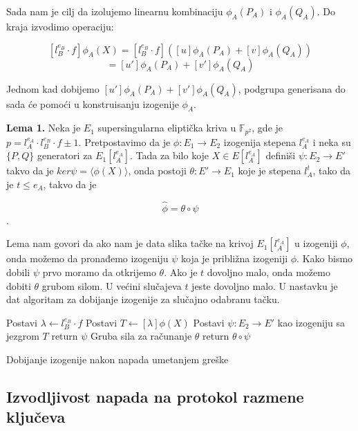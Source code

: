 \documentclass[a4paper]{article}
\begin{document}
\noindent Sada nam je cilj da izolujemo linearnu kombinaciju $ \phi_A(P_A)$ i  $ \phi_A(Q_A)$. Do kraja izvodimo operaciju:

$$[l^{e_B}_{B} \cdot f]\phi_A(X) = [l^{e_B}_{B} \cdot f] ([u]\phi_A(P_A) + [v]\phi_A(Q_A))$$
$$= [u']\phi_A(P_A) + [v']\phi_A(Q_A)$$

Jednom kad dobijemo $ [u']\phi_A(P_A) + [v']\phi_A(Q_A)$, podgrupa generisana do sada će pomoći u konstruisanju izogenije $\phi_A$.


\textbf{Lema 1.} Neka je $E_1$ supersingularna eliptička kriva u $\mathbb{F}_{p^2}$, gde je $p = l^{e_A}_{A} \cdot l^{e_B}_{B} \cdot f \pm 1$. Pretpostavimo da je $\phi : E_1 \longrightarrow E_2$ izogenija stepena $l_A^{e_A}$ i neka su $\{P, Q\}$ generatori za $E_1[l_A^{e_A}]$. Tada za bilo koje $X \in E[l_A^{e_A}]$ definiši $\psi : E_2 \longrightarrow E'$ takvo da je $ker \psi = \langle \phi(X) \rangle$, onda postoji $\theta: E' \longrightarrow E_1$ koje je stepena $l_A^t$, tako da je $t \leq e_A$, takvo da je 

$$\widehat{\phi} = \theta \circ \psi$$.  

Lema nam govori da ako nam je data slika tačke na krivoj $E_1[l^{e_A}_A]$ u izogeniji $\phi$, onda možemo da pronađemo izogeniju $\psi$ koja je približna izogeniji $\phi$. Kako bismo dobili $\psi$ prvo moramo da otkrijemo $\theta$. Ako je $t$ dovoljno malo, onda možemo dobiti $\theta$ grubom silom. U većini slučajeva $t$ jeste dovoljno malo. U nastavku je dat algoritam za dobijanje izogenije za slučajno odabranu tačku.


\begin{algorithm}
	\label{alg: napad greskom}
	
	\Output{$\widehat{\phi}$}

	Postavi $\lambda \longleftarrow l_B^{e_B} \cdot f$ \;
	Postavi $T \longleftarrow [\lambda]\phi(X)$ \;
	Postavi $\psi: E_2 \longrightarrow E'$ kao izogeniju sa jezgrom $T$\;
		{
			return $\psi$
		}
		{
			Gruba sila za računanje $\theta$
		}
	return $\theta \circ \psi$
	\caption{Dobijanje izogenije nakon napada umetanjem greške}
\end{algorithm}


\subsection{Izvodljivost napada na protokol razmene ključeva}
\end{document}
